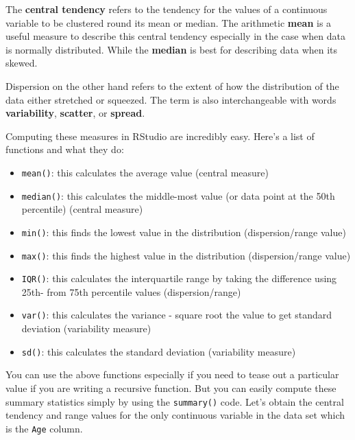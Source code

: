 \documentclass[
]{book}
\newenvironment{Shaded}{\begin{snugshade}}{\end{snugshade}}
\newcommand{\CommentTok}[1]{\textcolor[rgb]{0.56,0.35,0.01}{\textit{#1}}}
\newcommand{\FunctionTok}[1]{\textcolor[rgb]{0.00,0.00,0.00}{#1}}
\newcommand{\NormalTok}[1]{#1}
\newcommand{\SpecialCharTok}[1]{\textcolor[rgb]{0.00,0.00,0.00}{#1}}
\providecommand{\tightlist}{%
  \setlength{\itemsep}{0pt}\setlength{\parskip}{0pt}}
\begin{document}
The \textbf{central tendency} refers to the tendency for the values of a continuous variable to be clustered round its mean or median. The arithmetic \textbf{mean} is a useful measure to describe this central tendency especially in the case when data is normally distributed. While the \textbf{median} is best for describing data when its skewed.

Dispersion on the other hand refers to the extent of how the distribution of the data either stretched or squeezed. The term is also interchangeable with words \textbf{variability}, \textbf{scatter}, or \textbf{spread}.

Computing these measures in RStudio are incredibly easy. Here's a list of functions and what they do:

\begin{itemize}
\tightlist
\item
  \texttt{mean()}: this calculates the average value (central measure)
\item
  \texttt{median()}: this calculates the middle-most value (or data point at the 50th percentile) (central measure)
\item
  \texttt{min()}: this finds the lowest value in the distribution (dispersion/range value)
\item
  \texttt{max()}: this finds the highest value in the distribution (dispersion/range value)
\item
  \texttt{IQR()}: this calculates the interquartile range by taking the difference using 25th- from 75th percentile values (dispersion/range)
\item
  \texttt{var()}: this calculates the variance - square root the value to get standard deviation (variability measure)
\item
  \texttt{sd()}: this calculates the standard deviation (variability measure)
\end{itemize}

You can use the above functions especially if you need to tease out a particular value if you are writing a recursive function. But you can easily compute these summary statistics simply by using the \texttt{summary()} code. Let's obtain the central tendency and range values for the only continuous variable in the data set which is the \texttt{Age} column.

\begin{Shaded}
\end{Shaded}
\end{document}
